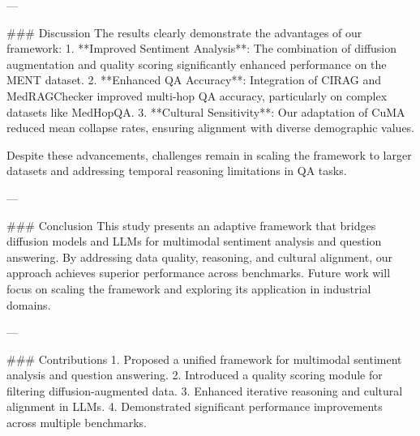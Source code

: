 ---

### Discussion
The results clearly demonstrate the advantages of our framework:
1. **Improved Sentiment Analysis**: The combination of diffusion augmentation and quality scoring significantly enhanced performance on the MENT dataset.
2. **Enhanced QA Accuracy**: Integration of CIRAG and MedRAGChecker improved multi-hop QA accuracy, particularly on complex datasets like MedHopQA.
3. **Cultural Sensitivity**: Our adaptation of CuMA reduced mean collapse rates, ensuring alignment with diverse demographic values.

Despite these advancements, challenges remain in scaling the framework to larger datasets and addressing temporal reasoning limitations in QA tasks.

---

### Conclusion
This study presents an adaptive framework that bridges diffusion models and LLMs for multimodal sentiment analysis and question answering. By addressing data quality, reasoning, and cultural alignment, our approach achieves superior performance across benchmarks. Future work will focus on scaling the framework and exploring its application in industrial domains.

---

### Contributions
1. Proposed a unified framework for multimodal sentiment analysis and question answering.
2. Introduced a quality scoring module for filtering diffusion-augmented data.
3. Enhanced iterative reasoning and cultural alignment in LLMs.
4. Demonstrated significant performance improvements across multiple benchmarks.

